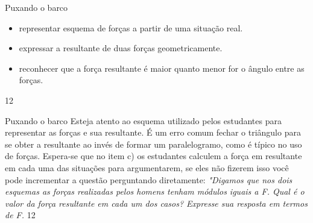 \clearpage
\def\currentcolor{session2}
\begin{objectives}{Puxando o barco}
{
\begin{itemize}
\item {} 
representar esquema de forças a partir de uma situação real.

\item {} 
expressar a resultante de duas forças geometricamente.

\item {} 
reconhecer que a força resultante é maior quanto menor for o ângulo entre as forças.

\end{itemize}
}{1}{2}
\end{objectives}
\begin{sugestions}{Puxando o barco}
{
Esteja atento ao esquema utilizado pelos estudantes para representar as forças e sua resultante. É um erro comum fechar o triângulo para se obter a resultante ao invés de formar um paralelogramo, como é típico no uso de forças. Espera-se que no item c) os estudantes calculem a força em resultante em cada uma das situações para argumentarem, se eles não fizerem isso você pode incrementar a questão perguntando diretamente: \textit{"Digamos que nos dois esquemas as forças realizadas pelos homens tenham módulos iguais a F. Qual é o valor da força resultante em cada um dos casos? Expresse sua resposta em termos de F.}
}{1}{2}
\end{sugestions}
